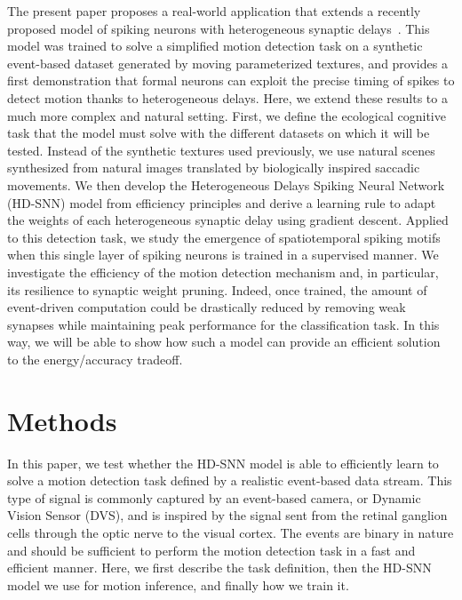 \documentclass[default]{sn-jnl}%
\theoremstyle{thmstyleone}%
\theoremstyle{thmstyletwo}%
\theoremstyle{thmstylethree}%
\begin{document}
The present paper proposes a real-world application that extends a recently proposed model of spiking neurons with heterogeneous synaptic delays~\cite{grimaldi_learning_2022}. This model was trained to solve a simplified motion detection task on a synthetic event-based dataset generated by moving parameterized textures, and provides a first demonstration that formal neurons can exploit the precise timing of spikes to detect motion thanks to heterogeneous delays. Here, we extend these results to a much more complex and natural setting. First, we define the ecological cognitive task that the model must solve with the different datasets on which it will be tested. Instead of the synthetic textures used previously, we use natural scenes synthesized from natural images translated by biologically inspired saccadic movements. We then develop the Heterogeneous Delays Spiking Neural Network (HD-SNN) model from efficiency principles and derive a learning rule to adapt the weights of each heterogeneous synaptic delay using gradient descent. Applied to this detection task, we study the emergence of spatiotemporal spiking motifs when this single layer of spiking neurons is trained in a supervised manner. We investigate the efficiency of the motion detection mechanism and, in particular, its resilience to synaptic weight pruning. Indeed, once trained, the amount of event-driven computation could be drastically reduced by removing weak synapses while maintaining peak performance for the classification task. In this way, we will be able to show how such a model can provide an efficient solution to the energy/accuracy tradeoff.
%
\section{Methods}
\label{sec:methods}
In this paper, we test whether the HD-SNN model is able to efficiently learn to solve a motion detection task defined by a realistic event-based data stream. This type of signal is commonly captured by an event-based camera, or Dynamic Vision Sensor (DVS), and is inspired by the signal sent from the retinal ganglion cells through the optic nerve to the visual cortex. The events are binary in nature and should be sufficient to perform the motion detection task in a fast and efficient manner. Here, we first describe the task definition, then the HD-SNN model we use for motion inference, and finally how we train it.
%
\end{document}

